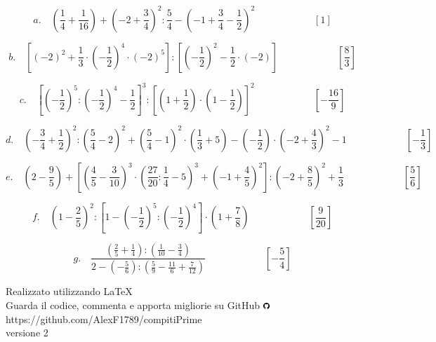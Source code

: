 \documentclass[]{article}
\begin{document}
\begin{enumerate}
		\[a.\quad\left(\frac14+\frac1{16}\right)+\left(-2+\frac34\right)^2:\frac54-\left(-1+\frac34-\frac12\right)^2\qquad\qquad\qquad\left[1\right]\]
		
		\[b.\quad\left[(-2)^2+\frac13\cdot\left(-\frac12\right)^4\cdot(-2)^5\right]:\left[\left(-\frac12\right)^2-\frac12\cdot(-2)\right]\qquad\qquad\qquad\left[\frac83\right]\]
		
		\[c.\quad\left[\left(-\frac12\right)^5:\left(-\frac12\right)^4-\frac12\right]^3:\left[\left(1+\frac12\right)\cdot\left(1-\frac12\right)\right]^2\qquad\qquad\qquad\left[-\frac{16}9\right]\]
		
		\[d.\quad\left(-\frac34+\frac12\right)^2:\left(\frac54-2\right)^2+\left(\frac54-1\right)^2\cdot\left(\frac13+5\right)-\left(-\frac12\right)\cdot\left(-2+\frac43\right)^2-1\qquad\qquad\qquad\left[-\frac13\right]\]
		
		\[e.\quad\left(2-\frac95\right)+\left[\left(\frac45-\frac3{10}\right)^3\cdot\left(\frac{27}{20}:\frac14-5\right)^3+\left(-1+\frac45\right)^2\right]:\left(-2+\frac85\right)^2+\frac13\qquad\qquad\qquad\left[\frac56\right]\]
		
		\[f.\quad\left(1-\frac25\right)^2:\left[1-\left(-\frac12\right)^5:\left(-\frac12\right)^4\right]\cdot\left(1+\frac78\right)\qquad\qquad\qquad\left[\frac9{20}\right]\]
		
		\[g.\quad\frac{\left(\frac25+\frac14\right):\left(\frac1{10}-\frac34\right)}{2-\left(-\frac56\right):\left(\frac59-\frac{11}6+\frac7{12}\right)}\qquad\qquad\qquad\left[-\frac54\right]\]
		
		
\end{enumerate}

\vfill

\begin{center}
	Realizzato utilizzando \LaTeX \\ Guarda il codice, commenta e apporta migliorie su GitHub \includegraphics[height=0.25cm]{git} \\ \parskip=25pt
\tiny{https://github.com/AlexF1789/compitiPrime} \\
\vspace*{1cm}versione 2
\end{center}
\end{document}
